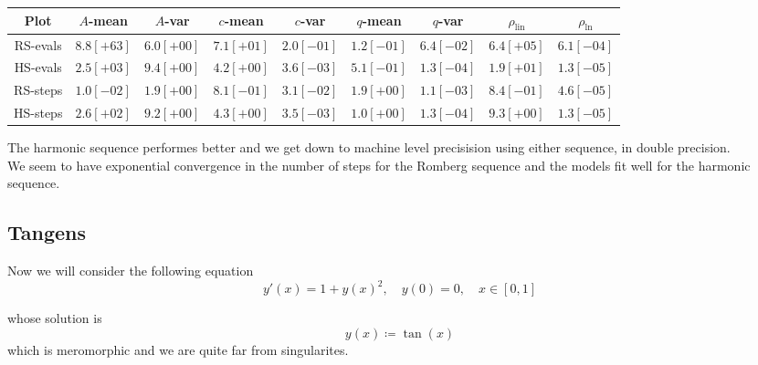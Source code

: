\begin{table}[H]
    \centering
    \small
    \begin{tabular}{c||c|c|c|c|c|c|c|c}
Plot & \(A\)-mean & \(A\)-var & \(c\)-mean & \(c\)-var & \(q\)-mean & \(q\)-var & \(\rho_{\operatorname{lin}}\) & \(\rho_{\ln}\)\\\hline
\rowcolor{red}
RS-evals & \(8.8[+63]\) & \(6.0[+00]\) & \(7.1[+01]\) & \(2.0[-01]\) & \(1.2[-01]\) & \(6.4[-02]\) & \(6.4[+05]\) & \(6.1[-04]\) \\
\rowcolor{green}
HS-evals & \(2.5[+03]\) & \(9.4[+00]\) & \(4.2[+00]\) & \(3.6[-03]\) & \(5.1[-01]\) & \(1.3[-04]\) & \(1.9[+01]\) & \(1.3[-05]\) \\
\rowcolor{green}
RS-steps & \(1.0[-02]\) & \(1.9[+00]\) & \(8.1[-01]\) & \(3.1[-02]\) & \(1.9[+00]\) & \(1.1[-03]\) & \(8.4[-01]\) & \(4.6[-05]\) \\
\rowcolor{green}
HS-steps & \(2.6[+02]\) & \(9.2[+00]\) & \(4.3[+00]\) & \(3.5[-03]\) & \(1.0[+00]\) & \(1.3[-04]\) & \(9.3[+00]\) & \(1.3[-05]\) \\
    \end{tabular}
    \label{tab:my_label}
\end{table}

The harmonic sequence performes better and we get down to machine level precisision using either sequence, in double precision.\\

We seem to have exponential convergence in the number of steps for the Romberg sequence and the models fit well for the harmonic sequence.\\

\subsection{Tangens}

Now we will consider the following equation
\begin{equation}
y'(x) = 1 + y(x)^2, \quad y(0) = 0,\quad x\in [0,1]
\end{equation}

whose solution is 
\[
y(x) \coloneqq \tan(x)
\]
which is meromorphic and we are quite far from singularites.

